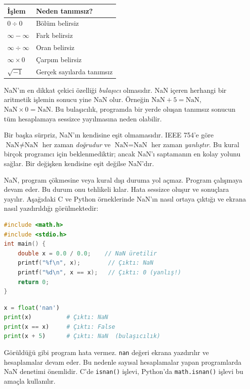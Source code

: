 \begin{center}
\small
\begin{tabular}{l l}
\toprule
\textbf{İşlem} & \textbf{Neden tanımsız?} \\
\midrule
$0 \div 0$ & Bölüm belirsiz \\
$\infty - \infty$ & Fark belirsiz \\
$\infty \div \infty$ & Oran belirsiz \\
$\infty \times 0$ & Çarpım belirsiz \\
$\sqrt{-1}$ & Gerçek sayılarda tanımsız \\
\bottomrule
\end{tabular}
\end{center}

NaN'ın en dikkat çekici özelliği \emph{bulaşıcı} olmasıdır. NaN içeren herhangi bir aritmetik işlemin sonucu yine NaN olur. Örneğin $\text{NaN} + 5 = \text{NaN}$, $\text{NaN} \times 0 = \text{NaN}$. Bu bulaşıcılık, programda bir yerde oluşan tanımsız sonucun tüm hesaplamaya sessizce yayılmasına neden olabilir.

Bir başka sürpriz, NaN'ın kendisine eşit olmamasıdır. IEEE 754'e göre $\text{NaN} \neq \text{NaN}$ her zaman \emph{doğrudur} ve $\text{NaN} = \text{NaN}$ her zaman \emph{yanlıştır}. Bu kural birçok programcı için beklenmediktir; ancak NaN'ı saptamanın en kolay yolunu sağlar. Bir değişken kendisine eşit değilse NaN'dır.

\begin{bilginot}
NaN, program çökmesine veya kural dışı duruma yol açmaz. Program çalışmaya devam eder. Bu durum onu tehlikeli kılar. Hata sessizce oluşur ve sonuçlara yayılır. Aşağıdaki C ve Python örneklerinde NaN'ın nasıl ortaya çıktığı ve ekrana nasıl yazdırıldığı görülmektedir:

\begin{lstlisting}[language=C, xleftmargin=2em]
#include <math.h>
#include <stdio.h>
int main() {
    double x = 0.0 / 0.0;    // NaN üretilir
    printf("%f\n", x);        // Çıktı: NaN
    printf("%d\n", x == x);   // Çıktı: 0 (yanlış!)
    return 0;
}
\end{lstlisting}

\begin{lstlisting}[language=Python, xleftmargin=2em]
x = float('nan')
print(x)          # Çıktı: NaN
print(x == x)     # Çıktı: False
print(x + 5)      # Çıktı: NaN  (bulaşıcılık)
\end{lstlisting}

Görüldüğü gibi program hata vermez. \texttt{nan} değeri ekrana yazdırılır ve hesaplamalar devam eder. Bu nedenle sayısal hesaplamalar yapan programlarda NaN denetimi önemlidir. C'de \texttt{isnan()} işlevi, Python'da \texttt{math.isnan()} işlevi bu amaçla kullanılır.
\end{bilginot}


